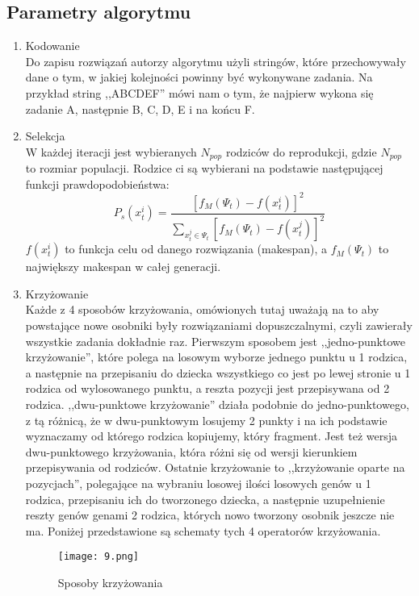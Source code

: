 \documentclass{article}
\begin{document}
\subsection{Parametry algorytmu}
 \begin{enumerate}
 \item Kodowanie\\
 Do zapisu rozwiązań autorzy algorytmu użyli stringów, które przechowywały dane o tym, w jakiej kolejności powinny być wykonywane zadania. Na przykład string ,,ABCDEF'' mówi nam o tym, że najpierw wykona się zadanie A, następnie B, C, D, E i na końcu F.

 \item Selekcja\\
 W każdej iteracji jest wybieranych $N_{pop}$ rodziców do reprodukcji, gdzie $N_{pop}$ to rozmiar populacji. Rodzice ci są wybierani na podstawie następującej funkcji prawdopodobieństwa:
 \begin{equation}
 P_{s}(x_{t}^{i}) = \frac {[f_{M}(\Psi_{t}) - f(x_{t}^{i})]^{2}}{ \sum_{x_{t}^{j} \in \Psi_{t}}  [f_{M}(\Psi_{t}) - f(x_{t}^{j})]^{2} }
 \end{equation}
 $f(x_{t}^{i})$ to funkcja celu od danego rozwiązania (makespan), a $f_{M}(\Psi_{t})$ to największy makespan w całej generacji.

 \item Krzyżowanie\\
 \newcommand{\RomanNumeralCaps}[1]
    {\MakeUppercase{\romannumeral #1}}
 Każde z 4 sposobów krzyżowania, omówionych tutaj uważają na to aby powstające nowe osobniki były rozwiązaniami dopuszczalnymi, czyli zawierały wszystkie zadania dokładnie raz. Pierwszym sposobem jest ,,jedno-punktowe krzyżowanie'', które polega na losowym wyborze jednego punktu u 1 rodzica, a następnie na przepisaniu do dziecka wszystkiego co jest po lewej stronie u 1 rodzica od wylosowanego punktu, a reszta pozycji jest przepisywana od 2 rodzica. ,,dwu-punktowe krzyżowanie'' działa podobnie do jedno-punktowego, z tą różnicą, że w dwu-punktowym losujemy 2 punkty i na ich podstawie wyznaczamy od którego rodzica kopiujemy, który fragment. Jest też \RomanNumeralCaps{2} wersja dwu-punktowego krzyżowania, która różni się od \RomanNumeralCaps{1} wersji kierunkiem przepisywania od rodziców. Ostatnie krzyżowanie to ,,krzyżowanie oparte na pozycjach'', polegające na wybraniu losowej ilości losowych genów u 1 rodzica, przepisaniu ich do tworzonego dziecka, a następnie uzupełnienie reszty genów genami 2 rodzica, których nowo tworzony osobnik jeszcze nie ma. Poniżej przedstawione są schematy tych 4 operatorów krzyżowania.
 \begin{figure}[H]
 \centering
 \texttt{[image: 9.png]}
 \caption{Sposoby krzyżowania}
 \end{figure}


\end{enumerate}
\end{document}
